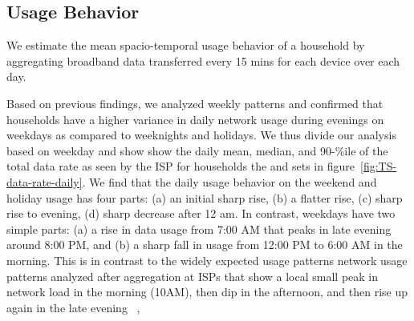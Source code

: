 \subsection{Usage Behavior}
\label{subsec:behavior}

We estimate the mean spacio-temporal usage behavior of a household by aggregating broadband data transferred every 15 mins for each device over each day.



Based on previous findings, we analyzed weekly patterns and confirmed that households have a higher variance in daily network usage during evenings on weekdays as compared to weeknights and holidays. We thus divide our analysis based on weekday and show show the daily mean, median, and 90-\%ile of the total data rate as seen by the ISP for households the \control and \test sets in figure~\ref{fig:TS-data-rate-daily}. We find that the daily usage behavior on the weekend and holiday usage has four parts: (a) an initial sharp rise, (b) a flatter rise, (c) sharp rise to evening, (d) sharp decrease after 12 am.
In contrast, weekdays have two simple parts: (a) a rise in data usage from 7:00 AM that peaks in late evening around 8:00 PM, and (b) a sharp fall in usage from 12:00 PM to 6:00 AM in the morning. This is in contrast to the widely expected usage patterns network usage patterns analyzed after aggregation at ISPs that show a local small peak in network load in the morning (10AM), then dip in the afternoon, and then rise up again in the late evening ~\cite{sandvine2014report1}, 

